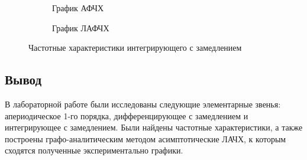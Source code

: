 \documentclass[a4paper, 12pt]{article}
\begin{document}
\begin{figure}[h!]
    \begin{subfigure}{0.5\textwidth}
        \centering
        \caption{График АФЧХ}
    \end{subfigure}
    \begin{subfigure}{0.5\textwidth}
        \centering
        \caption{График ЛАФЧХ}
    \end{subfigure}
    \caption{Частотные характеристики интегрирующего с замедлением}
\end{figure}

\newpage
\begin{center}
	\section*{Вывод}
\end{center}
\par 
В лабораторной работе были исследованы следующие элементарные звенья: апериодическое 1-го порядка, дифференцирующее с замедлением и интегрирующее с замедлением. Были найдены частотные характеристики, а также построены графо-аналитическим методом асимптотические ЛАЧХ, к которым сходятся полученные экспериментально графики.
\end{document}
